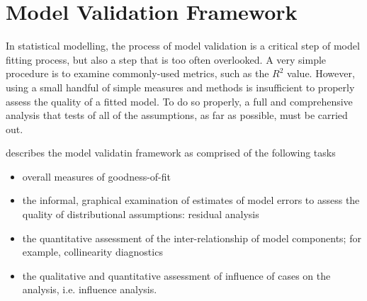 \documentclass[12pt, a4paper]{report}
\theoremstyle{plain}
\theoremstyle{definition}
\theoremstyle{remark}
\begin{document}









\newpage
\section{Model Validation Framework}
In statistical modelling, the process of model validation is a critical step of model fitting process, but also a step that is too often overlooked. A very simple procedure is to examine commonly-used
metrics, such as the $R^2$ value. However, using a small handful of simple measures and methods is insufficient to properly assess the quality of a fitted model. To do so properly, a full and comprehensive
analysis that tests of all of the assumptions, as far as possible, must be carried out.

\citet{schab} describes the model validatin framework as comprised of the following tasks
\begin{itemize}
	\item  overall measures of goodness-of-fit
	\item the informal, graphical examination of estimates of model errors to assess the quality of distributional
	assumptions: residual analysis
	
	
	\item the quantitative assessment of the inter-relationship of model components; for example, collinearity 	diagnostics
	\item the qualitative and quantitative assessment of influence of cases on the analysis, i.e. influence analysis.
\end{itemize}
\end{document}
